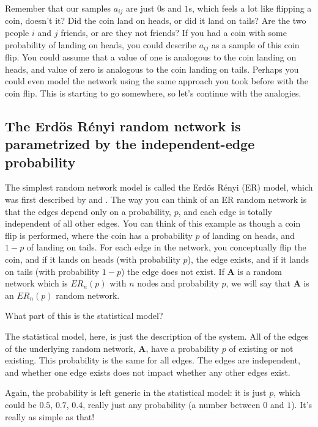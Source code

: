Remember that our samples $a_{ij}$ are just $0$s and $1$s, which {feels} a lot like flipping a coin, doesn't it? Did the coin land on heads, or did it land on tails? Are the two people $i$ and $j$ friends, or are they not friends? If you had a coin with some probability of landing on heads, you could describe $a_{ij}$ as a sample of this coin flip. You could assume that a value of one is analogous to the coin landing on heads, and value of zero is analogous to the coin landing on tails. Perhaps you could even model the network using the same approach you took before with the coin flip. This is starting to go somewhere, so let's continue with the analogies.


\subsection{The Erd\"os R\'enyi random network is parametrized by the independent-edge probability}

The simplest random network model is called the Erd\"os R\'enyi (ER) model, which was first described by \cite{erdos59a} and \cite{Gilbert1959Dec}. The way you can think of an ER random network is that the edges depend {only} on a probability, $p$, and each edge is totally independent of all other edges. You can think of this example as though a coin flip is performed, where the coin has a probability $p$ of landing on heads, and $1-p$ of landing on tails. For each edge in the network, you conceptually flip the coin, and if it lands on heads (with probability $p$), the edge exists, and if it lands on tails (with probability $1-p$) the edge does not exist. If $\mathbf A$ is a random network which is $ER_n(p)$ with $n$ nodes and probability $p$, we will say that $\mathbf A$ is an $ER_n(p)$ random network.

\begin{floatingbox}[h]\caption{What part of this is the statistical model?}
The statistical model, here, is just the description of the system. {All} of the edges of the underlying random network, $\mathbf A$, have a probability $p$ of existing or not existing. This probability is the same for all edges. The edges are independent, and whether one edge exists does not impact whether any other edges exist. 

Again, the probability is left generic in the statistical model: it is just $p$, which could be $0.5$, $0.7$, $0.4$, really just any probability (a number between $0$ and $1$). It's really as simple as that!
\end{floatingbox}


